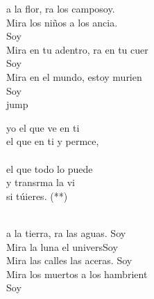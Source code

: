 \begin{cancion}[Soy yo][Almudena]%
	a la flor, ra los camposoy.\\
	Mira los niños a los ancia. \\
	Soy \\
	Mira en tu adentro, ra en tu cuer\\
	Soy \\
	Mira en el mundo,  estoy murien \\
	Soy \\jump\\
	\begin{chorus}%
	 yo el que ve en ti\\
	el que  en ti y permce,\\
	\jump\\
el que todo lo puede \\
	y transrma la vi\\
	si túieres. (**)\\
	\end{chorus}%
	\jump\\
	a la tierra, ra las aguas. Soy\\
	Mira la luna el universSoy \\
	Mira las calles las aceras. Soy \\
	Mira los muertos a los hambrient\\
	Soy \\
\end{cancion}%
